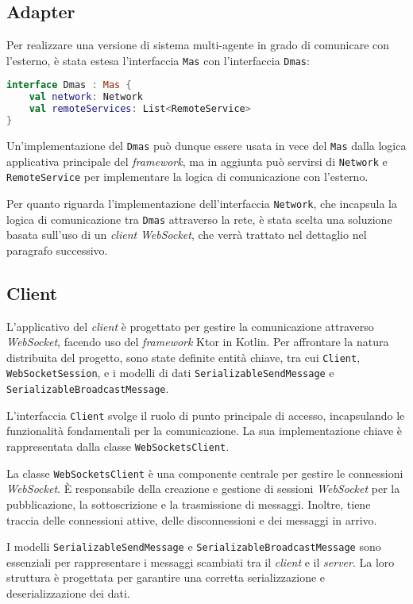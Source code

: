 \subsection{Adapter}
Per realizzare una versione di sistema multi-agente in grado di comunicare con l'esterno, è stata estesa l'interfaccia \texttt{Mas} con l'interfaccia \texttt{Dmas}:

\begin{lstlisting}[language=Kotlin]
interface Dmas : Mas {
    val network: Network
    val remoteServices: List<RemoteService>
}
\end{lstlisting}

Un'implementazione del \texttt{Dmas} può dunque essere usata in vece del \texttt{Mas} dalla logica applicativa principale del \textit{framework}, ma in aggiunta può servirsi di \texttt{Network} e \texttt{RemoteService} per
implementare la logica di comunicazione con l'esterno.

Per quanto riguarda l'implementazione dell'interfaccia \texttt{Network}, che incapsula la logica di comunicazione tra \texttt{Dmas} attraverso la rete, è stata scelta una soluzione basata sull'uso
di un \textit{client} \textit{WebSocket}, che verrà trattato nel dettaglio nel paragrafo successivo.

\subsection{Client}
L'applicativo del \textit{client} è progettato per gestire la comunicazione attraverso \textit{WebSocket},
facendo uso del \textit{framework} Ktor in Kotlin. Per affrontare la natura distribuita del progetto,
sono state definite entità chiave, tra cui \texttt{Client}, \texttt{WebSocketSession}, e i modelli di dati
\texttt{SerializableSendMessage} e \texttt{SerializableBroadcastMessage}.

L'interfaccia \texttt{Client} svolge il ruolo di punto principale di accesso, incapsulando le funzionalità fondamentali per la
comunicazione. La sua implementazione chiave è rappresentata dalla classe \texttt{WebSocketsClient}.

La classe \texttt{WebSocketsClient} è una componente centrale per gestire le connessioni \textit{WebSocket}.
È responsabile della creazione e gestione di sessioni \textit{WebSocket} per la pubblicazione,
la sottoscrizione e la trasmissione di messaggi. Inoltre, tiene traccia delle connessioni attive, delle disconnessioni e dei messaggi in arrivo.

I modelli \texttt{SerializableSendMessage} e \texttt{SerializableBroadcastMessage} sono essenziali per rappresentare i messaggi scambiati tra il \textit{client} e
il  \textit{server}. La loro struttura è progettata per garantire una corretta serializzazione e deserializzazione dei dati.

